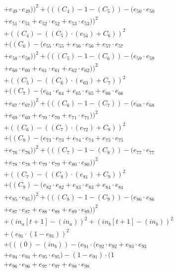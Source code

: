 \documentclass[10pt, a4paper]{article}
\begin{document}
\begin{small}
\begin{align*}
& + e_{49} \cdot e_{49}))^{2} + (((C_{4}) - 1 - (C_{5})) - (e_{50} \cdot e_{50} \\
& + e_{51} \cdot e_{51} + e_{52} \cdot e_{52} + e_{53} \cdot e_{53}))^{2} \\
& + ((C_{4}) - ((C_{5})  \cdot  (e_{54}) + C_{6}))^{2} \\
& + ((C_{6}) - (e_{55} \cdot e_{55} + e_{56} \cdot e_{56} + e_{57} \cdot e_{57} \\
& + e_{58} \cdot e_{58}))^{2} + (((C_{5}) - 1 - (C_{6})) - (e_{59} \cdot e_{59} \\
& + e_{60} \cdot e_{60} + e_{61} \cdot e_{61} + e_{62} \cdot e_{62}))^{2} \\
& + ((C_{5}) - ((C_{6})  \cdot  (e_{63}) + C_{7}))^{2} \\
& + ((C_{7}) - (e_{64} \cdot e_{64} + e_{65} \cdot e_{65} + e_{66} \cdot e_{66} \\
& + e_{67} \cdot e_{67}))^{2} + (((C_{6}) - 1 - (C_{7})) - (e_{68} \cdot e_{68} \\
& + e_{69} \cdot e_{69} + e_{70} \cdot e_{70} + e_{71} \cdot e_{71}))^{2} \\
& + ((C_{6}) - ((C_{7})  \cdot  (e_{72}) + C_{8}))^{2} \\
& + ((C_{8}) - (e_{73} \cdot e_{73} + e_{74} \cdot e_{74} + e_{75} \cdot e_{75} \\
& + e_{76} \cdot e_{76}))^{2} + (((C_{7}) - 1 - (C_{8})) - (e_{77} \cdot e_{77} \\
& + e_{78} \cdot e_{78} + e_{79} \cdot e_{79} + e_{80} \cdot e_{80}))^{2} \\
& + ((C_{7}) - ((C_{8})  \cdot  (e_{81}) + C_{9}))^{2} \\
& + ((C_{9}) - (e_{82} \cdot e_{82} + e_{83} \cdot e_{83} + e_{84} \cdot e_{84} \\
& + e_{85} \cdot e_{85}))^{2} + (((C_{8}) - 1 - (C_{9})) - (e_{86} \cdot e_{86} \\
& + e_{87} \cdot e_{87} + e_{88} \cdot e_{88} + e_{89} \cdot e_{89}))^{2} \\
& + (in_a[t+1] - (in_a))^{2} + (in_b[t+1] - (in_b))^{2} \\
& + (e_{91} \cdot (1 - e_{91}))^{2} \\
& + (((0) - (in_b)) - (e_{91} \cdot (e_{92} \cdot e_{92} + e_{93} \cdot e_{93} \\
& + e_{94} \cdot e_{94} + e_{95} \cdot e_{95}) - (1 - e_{91}) \cdot (1 \\
& + e_{96} \cdot e_{96} + e_{97} \cdot e_{97} + e_{98} \cdot e_{98} \\

\end{align*}
\end{small}
\end{document}

